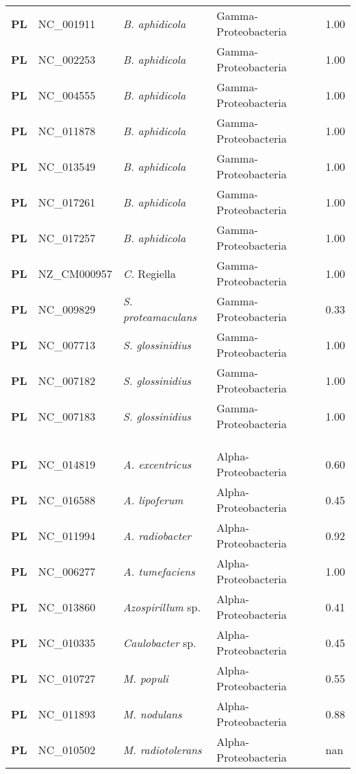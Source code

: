 \begin{adjustwidth}{-3cm}{2cm}
{\begin{supertabular}{>{\bfseries}l|p{0.1\textwidth}p{0.14\textwidth}l|l}
PL & NC\_001911 &  \textit{B. aphidicola} & Gamma-Proteobacteria & 1.00\\
PL & NC\_002253 &  \textit{B. aphidicola} & Gamma-Proteobacteria & 1.00\\
PL & NC\_004555 &  \textit{B. aphidicola} & Gamma-Proteobacteria & 1.00\\
PL & NC\_011878 &  \textit{B. aphidicola} & Gamma-Proteobacteria & 1.00\\
PL & NC\_013549 &  \textit{B. aphidicola} & Gamma-Proteobacteria & 1.00\\
PL & NC\_017261 &  \textit{B. aphidicola} & Gamma-Proteobacteria & 1.00\\
PL & NC\_017257 &  \textit{B. aphidicola} & Gamma-Proteobacteria & 1.00\\
PL & NZ\_CM000957 &  \textit{C.} Regiella & Gamma-Proteobacteria & 1.00\\
PL & NC\_009829 &  \textit{S. proteamaculans} & Gamma-Proteobacteria & 0.33\\
PL & NC\_007713 &  \textit{S. glossinidius} & Gamma-Proteobacteria & 1.00\\
PL & NC\_007182 &  \textit{S. glossinidius} & Gamma-Proteobacteria & 1.00\\
PL & NC\_007183 &  \textit{S. glossinidius} & Gamma-Proteobacteria & 1.00\\
\\
\\
\hline\\
PL & NC\_014819 &  \textit{A. excentricus} & Alpha-Proteobacteria & 0.60\\
PL & NC\_016588 &  \textit{A. lipoferum} & Alpha-Proteobacteria & 0.45\\
PL & NC\_011994 &  \textit{A. radiobacter} & Alpha-Proteobacteria & 0.92\\
PL & NC\_006277 &  \textit{A. tumefaciens} & Alpha-Proteobacteria & 1.00\\
PL & NC\_013860 &  \textit{Azospirillum} sp. & Alpha-Proteobacteria & 0.41\\
PL & NC\_010335 &  \textit{Caulobacter} sp. & Alpha-Proteobacteria & 0.45\\
PL & NC\_010727 &  \textit{M. populi} & Alpha-Proteobacteria & 0.55\\
PL & NC\_011893 &  \textit{M. nodulans} & Alpha-Proteobacteria & 0.88\\
PL & NC\_010502 &  \textit{M. radiotolerans} & Alpha-Proteobacteria & nan\\

\end{supertabular}}
\end{adjustwidth}
